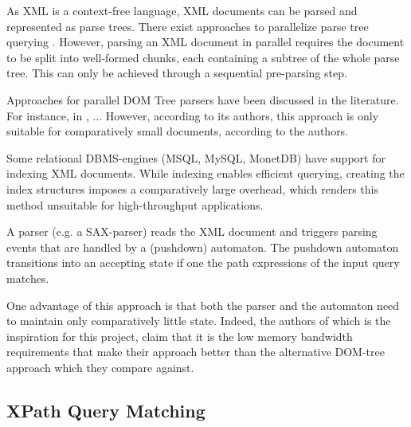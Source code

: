  As XML is a context-free language, XML
documents can be parsed and represented as parse trees. There exist approaches
to parallelize parse tree querying . However, parsing an
XML document in parallel requires the document to be split into well-formed
chunks, each containing a subtree of the whole parse tree. This can only be
achieved through a sequential pre-parsing step.

Approaches for parallel DOM Tree parsers have been discussed in the literature.
For instance, in , ... However, according to its authors, this
approach is only suitable for comparatively small documents, according to the
authors.


Some relational DBMS-engines (MSQL, MySQL, MonetDB) have support for indexing
XML documents. While indexing enables efficient querying, creating the index
structures imposes a comparatively large overhead, which renders this method
unsuitable for high-throughput applications.


A parser (e.g. a SAX-parser) reads the
XML document and triggers parsing events that are handled by a (pushdown)
automaton. The pushdown automaton transitions into an accepting state if one the
path expressions of the input query matches.

One advantage of this approach is that both the parser and the automaton need to
maintain only comparatively little state. Indeed, the authors of 
which is the inspiration for this project, claim that it is the low memory
bandwidth requirements that make their approach better than the alternative
DOM-tree approach which they compare against.

\subsection{XPath Query Matching}








